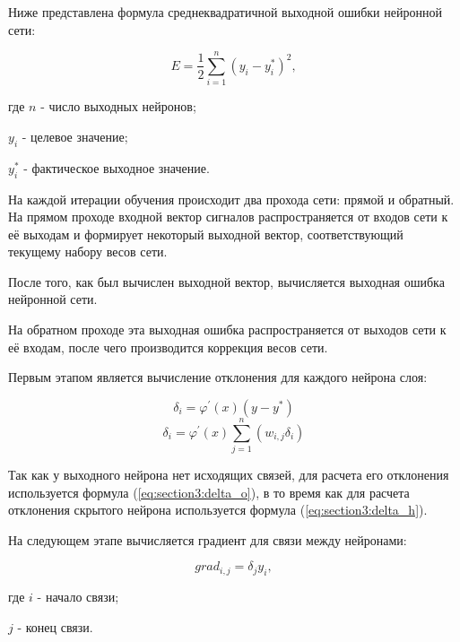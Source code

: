 Ниже представлена формула среднеквадратичной выходной ошибки нейронной сети:

\begin{equation*}
    \textstyle E = \frac{1}{2}\sum_{i = 1}^{n} (y_{i} - y_{i}^{*})^2,
\end{equation*}

\begin{explanation}
    \item[где] $n$ - число выходных нейронов;
    \item $y_{i}$ - целевое значение;
    \item $y_{i}^{*}$ - фактическое выходное значение. 
\end{explanation}

На каждой итерации обучения происходит два прохода сети: прямой и обратный.
На прямом проходе входной вектор сигналов распространяется от входов
сети к её выходам и формирует некоторый выходной вектор, соответствующий
текущему набору весов сети. 

После того, как был вычислен выходной вектор, вычисляется выходная ошибка
нейронной сети.

На обратном проходе эта выходная ошибка распространяется от выходов сети к
её входам, после чего производится коррекция весов сети.

Первым этапом является вычисление отклонения для каждого нейрона слоя:

\begin{equation}
    \textstyle \delta_{i} = \varphi^{'}(x) (y - y^{*})
    \label{eq:section3:delta_o}
\end{equation}
%
\begin{equation}
    \textstyle \delta_{i} = \varphi^{'}(x) \sum_{j = 1}^{n} (w_{i,j} \delta_{i})
    \label{eq:section3:delta_h}
\end{equation}

Так как у выходного нейрона нет исходящих связей, для расчета его отклонения
используется формула (\ref{eq:section3:delta_o}), 
в то время как для расчета отклонения скрытого нейрона 
используется формула (\ref{eq:section3:delta_h}).

На следующем этапе вычисляется градиент для связи между нейронами:

\begin{equation*}
    \textstyle grad_{i,j} = \delta_{j} y_{i},
\end{equation*}

\begin{explanation}
    \item[где] $i$ - начало связи;
    \item $j$ - конец связи.
\end{explanation}

